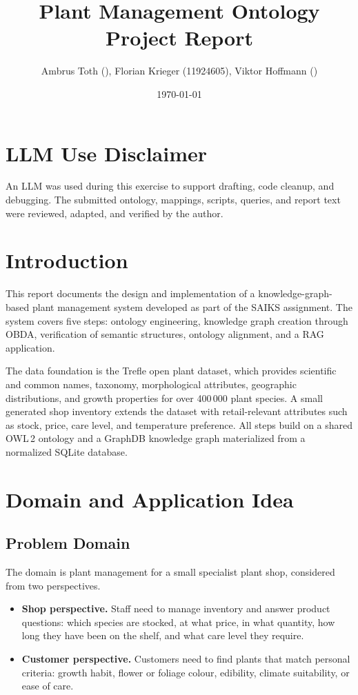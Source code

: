 \documentclass[11pt,a4paper]{article}
\title{Plant Management Ontology Project Report}
\author{Ambrus Toth (), Florian Krieger (11924605), Viktor Hoffmann ()}
\date{\today}
\begin{document}
\maketitle

\section*{LLM Use Disclaimer}

An LLM was used during this exercise to support drafting, code cleanup, and
debugging. The submitted ontology, mappings, scripts, queries, and report text
were reviewed, adapted, and verified by the author.


\section{Introduction}

This report documents the design and implementation of a knowledge-graph-based
plant management system developed as part of the SAIKS assignment.
The system covers five steps: ontology engineering, knowledge graph creation
through OBDA, verification of semantic structures, ontology alignment, and a
RAG application.

The data foundation is the Trefle open plant dataset, which provides scientific
and common names, taxonomy, morphological attributes, geographic distributions,
and growth properties for over 400\,000 plant species.
A small generated shop inventory extends the dataset with retail-relevant
attributes such as stock, price, care level, and temperature preference.
All steps build on a shared OWL\,2 ontology and a GraphDB knowledge graph
materialized from a normalized SQLite database.

\section{Domain and Application Idea}

\subsection{Problem Domain}


The domain is plant management for a small specialist plant shop, considered
from two perspectives.
\begin{itemize}
    \item \textbf{Shop perspective.}
Staff need to manage inventory and answer product questions: which species are
stocked, at what price, in what quantity, how long they have been on the shelf,
and what care level they require.
\item \textbf{Customer perspective.}
Customers need to find plants that match personal criteria: growth habit,
flower or foliage colour, edibility, climate suitability, or ease of care.
\end{itemize}
\end{document}
